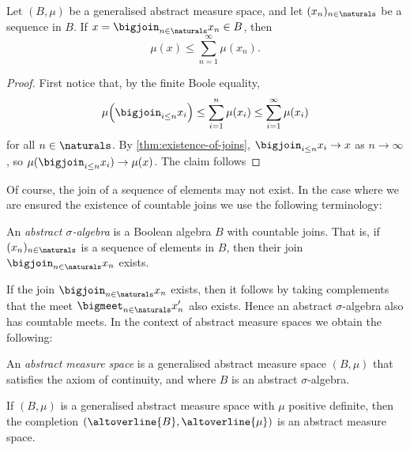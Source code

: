 \documentclass[article, a4paper, 11pt, oneside]{memoir}
\numberwithin{equation}{chapter}
\begin{document}
\begin{proposition}
    Let $(B,\mu)$ be a generalised abstract measure space, and let $(x_n)_{n\in\naturals}$ be a sequence in $B$. If $x = \bigjoin_{n\in\naturals} x_n \in B$, then
    \begin{equation*}
        \mu(x)
            \leq \sum_{n=1}^\infty \mu(x_n).
    \end{equation*}
\end{proposition}%

\begin{proof}
    First notice that, by the finite Boole equality,
    \begin{equation*}
        \mu \Bigl( \bigjoin_{i \leq n} x_i \Bigr)
            \leq \sum_{i=1}^n \mu(x_i)
            \leq \sum_{i=1}^\infty \mu(x_i)
    \end{equation*}
    for all $n \in \naturals$. By \cref{thm:existence-of-joins}, $\bigjoin_{i \leq n} x_i \to x$ as $n \to \infty$, so $\mu( \bigjoin_{i \leq n} x_i ) \to \mu(x)$. The claim follows
\end{proof}


Of course, the join of a sequence of elements may not exist. In the case where we are ensured the existence of countable joins we use the following terminology:

\begin{definition}
    \label{def:abstract-sigma-algebra}
    An \emph{abstract $\sigma$-algebra} is a Boolean algebra $B$ with countable joins. That is, if $(x_n)_{n\in\naturals}$ is a sequence of elements in $B$, then their join $\bigjoin_{n\in\naturals} x_n$ exists.
\end{definition}
%
If the join $\bigjoin_{n\in\naturals} x_n$ exists, then it follows by taking complements that the meet $\bigmeet_{n\in\naturals} x_n'$ also exists. Hence an abstract $\sigma$-algebra also has countable meets. In the context of abstract measure spaces we obtain the following:

\begin{definition}
    \label{def:abstract-measure-space}
    An \emph{abstract measure space} is a generalised abstract measure space $(B,\mu)$ that satisfies the axiom of continuity, and where $B$ is an abstract $\sigma$-algebra.
\end{definition}

\begin{lemma}
    \label{thm:completion-gives-countable-additivity}
    If $(B,\mu)$ is a generalised abstract measure space with $\mu$ positive definite, then the completion $(\altoverline{B},\altoverline{\mu})$ is an abstract measure space.
\end{lemma}
\end{document}
